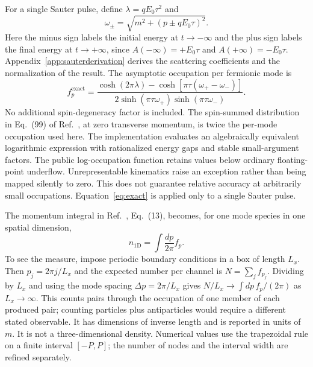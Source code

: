 \documentclass[11pt,a4paper]{article}
\begin{document}
For a single Sauter pulse, define $\lambda=qE_0\tau^2$ and
\begin{equation}
  \omega_{\pm}=\sqrt{m^2+(p\pm qE_0\tau)^2}.
\end{equation}
Here the minus sign labels the initial energy at $t\to-\infty$ and the plus sign labels the final energy at $t\to+\infty$, since $A(-\infty)=+E_0\tau$ and $A(+\infty)=-E_0\tau$. Appendix~\ref{app:sauterderivation} derives the scattering coefficients and the normalization of the result. The asymptotic occupation per fermionic mode is \cite{Hebenstreit2010}
\begin{equation}
  f_p^{\mathrm{exact}}=
  \frac{\cosh(2\pi\lambda)-
  \cosh\!\left[\pi\tau(\omega_+-\omega_-)\right]}
  {2\sinh(\pi\tau\omega_+)\sinh(\pi\tau\omega_-)}.
  \label{eq:exact}
\end{equation}
No additional spin-degeneracy factor is included. The spin-summed distribution in Eq.~(99) of Ref.~\cite{Hebenstreit2010}, at zero transverse momentum, is twice the per-mode occupation used here. The implementation evaluates an algebraically equivalent logarithmic expression with rationalized energy gaps and stable small-argument factors. The public log-occupation function retains values below ordinary floating-point underflow. Unrepresentable kinematics raise an exception rather than being mapped silently to zero. This does not guarantee relative accuracy at arbitrarily small occupations. Equation~\eqref{eq:exact} is applied only to a single Sauter pulse.

The momentum integral in Ref.~\cite{LiGong2021}, Eq.~(13), becomes, for one mode species in one spatial dimension,
\begin{equation}
  n_{1\mathrm D}=\int\frac{dp}{2\pi}f_p.
  \label{eq:density}
\end{equation}
To see the measure, impose periodic boundary conditions in a box of length $L_x$. Then $p_j=2\pi j/L_x$ and the expected number per channel is $N=\sum_j f_{p_j}$. Dividing by $L_x$ and using the mode spacing $\Delta p=2\pi/L_x$ gives $N/L_x\to\int dp\,f_p/(2\pi)$ as $L_x\to\infty$. This counts pairs through the occupation of one member of each produced pair; counting particles plus antiparticles would require a different stated observable. It has dimensions of inverse length and is reported in units of $m$. It is not a three-dimensional density. Numerical values use the trapezoidal rule on a finite interval $[-P,P]$; the number of nodes and the interval width are refined separately.
\end{document}
